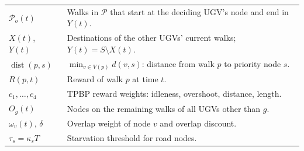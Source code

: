 \documentclass[11pt]{article}
\DeclareMathOperator{\dist}{dist}
\theoremstyle{definition}
\theoremstyle{plain}
\begin{document}
\begin{table}[H]
\begin{tabularx}{\linewidth}{lX}
$\mathcal{P}_o(t)$ & Walks in $\mathcal{P}$ that start at the deciding UGV's node and end in $Y(t)$. \\
$X(t)$, $Y(t)$ & Destinations of the other UGVs' current walks; $Y(t) = S \setminus X(t)$. \\
$\dist(p, s)$ & $\min_{v \in V(p)} d(v, s)$: distance from walk $p$ to priority node $s$. \\
$R(p, t)$ & Reward of walk $p$ at time $t$. \\
$c_1, \ldots, c_4$ & TPBP reward weights: idleness, overshoot, distance, length. \\
$O_g(t)$ & Nodes on the remaining walks of all UGVs other than $g$. \\
$\omega_v(t)$, $\delta$ & Overlap weight of node $v$ and overlap discount. \\
$\tau_s = \kappa_s T$ & Starvation threshold for road nodes. \\
\bottomrule
\end{tabularx}
\end{table}
\end{document}
